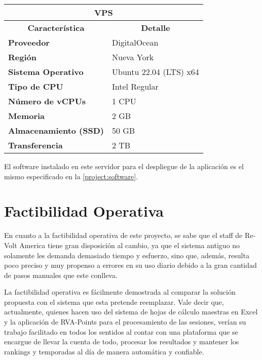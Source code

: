 \begin{center}
	\begin{tabular}{ | l | p{10cm} |}
		\hline
		\multicolumn{2}{|c|}{\textbf{VPS}} \\
		\hline
		\multicolumn{1}{|c|}{\textbf{Característica}} & \multicolumn{1}{|c|}{\textbf{Detalle}} \\
		\hline
		
		{\textbf{Proveedor}} & DigitalOcean \\ \hline
		
		{\textbf{Región}} & Nueva York \\ \hline
		
		{\textbf{Sistema Operativo}} & Ubuntu 22.04 (LTS) x64 \\ \hline
		
		{\textbf{Tipo de CPU}} & Intel Regular \\ \hline
		
		{\textbf{Número de vCPUs}} & 1 CPU\\ \hline
		
		{\textbf{Memoria}} & 2 GB \\ \hline
		
		{\textbf{Almacenamiento (SSD)}} & 50 GB \\ \hline
		
		{\textbf{Transferencia}} & 2 TB \\ \hline
	\end{tabular}
\end{center}

El software instalado en este servidor para el despliegue de la aplicación es el mismo especificado en la \autoref{project:software}.

\section{Factibilidad Operativa}
En cuanto a la factibilidad operativa de este proyecto, se sabe que el staff de Re-Volt America tiene gran disposición al cambio, ya que el sistema antiguo no solamente les demanda demasiado tiempo y esfuerzo, sino que, además, resulta poco preciso y muy propenso a errores en su uso diario debido a la gran cantidad de pasos manuales que este conlleva.

La factibilidad operativa es fácilmente demostrada al comparar la solución propuesta con el sistema que esta pretende reemplazar. Vale decir que, actualmente, quienes hacen uso del sistema de hojas de cálculo maestras en Excel y la aplicación de RVA-Points para el procesamiento de las sesiones, verían su trabajo facilitado en todos los sentidos al contar con una plataforma que se encargue de llevar la cuenta de todo, procesar los resultados y mantener los rankings y temporadas al día de manera automática y confiable.

